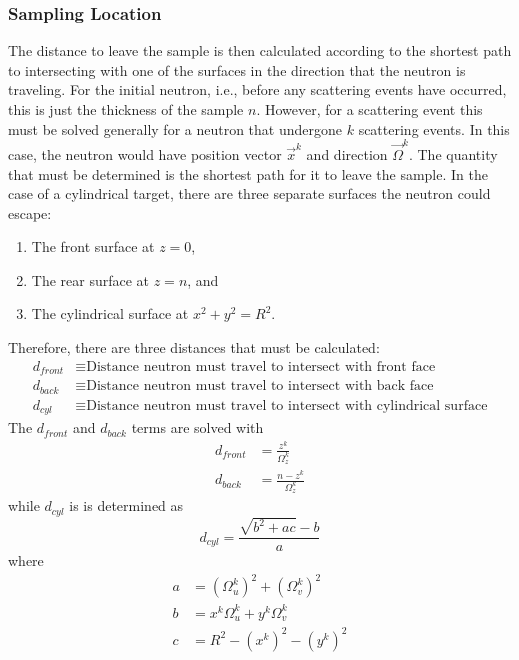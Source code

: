 \subsubsection{Sampling Location}
\label{sec:sampling-location-ms}
The distance to leave the sample is then calculated according to the shortest path to intersecting with one of the surfaces in the direction that the neutron is traveling. For the initial neutron, i.e., before any scattering events have occurred, this is just the thickness of the sample $n$. However, for a scattering event this must be solved generally for a neutron that undergone $k$ scattering events. In this case, the neutron would have position vector $\overrightarrow{x}^k$ and direction $\overrightarrow{\Omega}^k$. The quantity that must be determined is the shortest path for it to leave the sample. In the case of a cylindrical target, there are three separate surfaces the neutron could escape:
\begin{enumerate}
    \item The front surface at $z=0$,
    \item The rear surface at $z=n$, and
    \item The cylindrical surface at $x^2 + y^2 = R^2$.
\end{enumerate}
Therefore, there are three distances that must be calculated:
\begin{align*}
    d_{front}   &\equiv \text{Distance neutron must travel to intersect with front face} \\
    d_{back}    &\equiv \text{Distance neutron must travel to intersect with back face} \\
    d_{cyl}     &\equiv \text{Distance neutron must travel to intersect with cylindrical surface}
\end{align*}
The $d_{front}$ and $d_{back}$ terms are solved with
\begin{align}
    d_{front} &= \frac{z^k}{\Omega_{z}^{k}} \\
    d_{back} &= \frac{n - z^{k}}{\Omega^{k}_{z}}
\end{align}
while $d_{cyl}$ is is determined as
\begin{equation}
    \label{eq:cyl-intersection-distance}
    d_{cyl} = \frac{\sqrt{b^2 + ac} - b}{a}
\end{equation}
where
\begin{align}
    a &= \left( \Omega_{u}^{k} \right)^2 + \left( \Omega_{v}^{k} \right)^2\\
    b &= x^k \Omega_{u}^{k} + y^k\Omega_{v}^{k} \\
    c &= R^2 - \left( x^k \right)^2 - \left( y^k \right)^2
\end{align}

